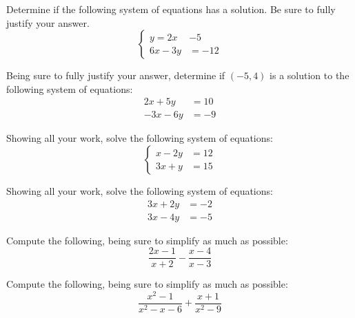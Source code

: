 \documentclass[12pt,letterpaper]{exam}
\begin{document}
\examtitle
{} 
\scores
\bottomline
\newpage

\begin{questions}

\newpage
\question[6] Determine if the following system of equations has a solution. Be sure to fully justify your answer.
	\[
	\left\{
	\begin{aligned}
	y= 2x &- 5 \\
	6x - 3y&= -12
	\end{aligned}\right.
	\]



\newpage
\question[6] Being sure to fully justify your answer, determine if $(-5, 4)$ is a solution to the following system of equations:
	\[
	\begin{aligned}
	2x + 5y&= 10 \\
	-3x - 6y&= -9
	\end{aligned}
	\]



\newpage
\question[6] Showing all your work, solve the following system of equations:
	\[
	\left\{
	\begin{aligned}
	x - 2y&= 12 \\
	3x + y&= 15
	\end{aligned}\right.
	\]



\newpage
\question[7] Showing all your work, solve the following system of equations:
	\[
	\begin{aligned}
	3x + 2y&= -2 \\
	3x - 4y&= -5
	\end{aligned}
	\]



\newpage
\question[6] Compute the following, being sure to simplify as much as possible:
	\[
	\dfrac{2x - 1}{x + 2} - \dfrac{x - 4}{x - 3}
	\]



\newpage
\question[6] Compute the following, being sure to simplify as much as possible:
	\[
	\dfrac{x^2 - 1}{x^2 - x - 6} + \dfrac{x + 1}{x^2 - 9}
	\]




\end{questions}
\end{document}

